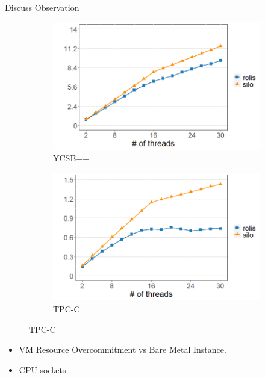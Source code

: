 \documentclass[xcolor=dvipsnames]{beamer}
\begin{document}
    \begin{frame}{Discuss Observation}

        \begin{figure}
            \begin{subfigure}[h]{0.5\textwidth}
                \includegraphics[scale=0.30]{fig10_ycsb.png}
                \caption{YCSB++}
            \end{subfigure}%
            \hfill
            \begin{subfigure}[h]{0.5\textwidth}
                \includegraphics[scale=0.30]{fig10_tpcc.png}
                \caption{TPC-C}
            \end{subfigure}
        \end{figure}

        \begin{itemize}
            \item VM Resource Overcommitment vs Bare Metal Instance. 
            \item CPU sockets.
        \end{itemize}

    \end{frame}
\end{document}
